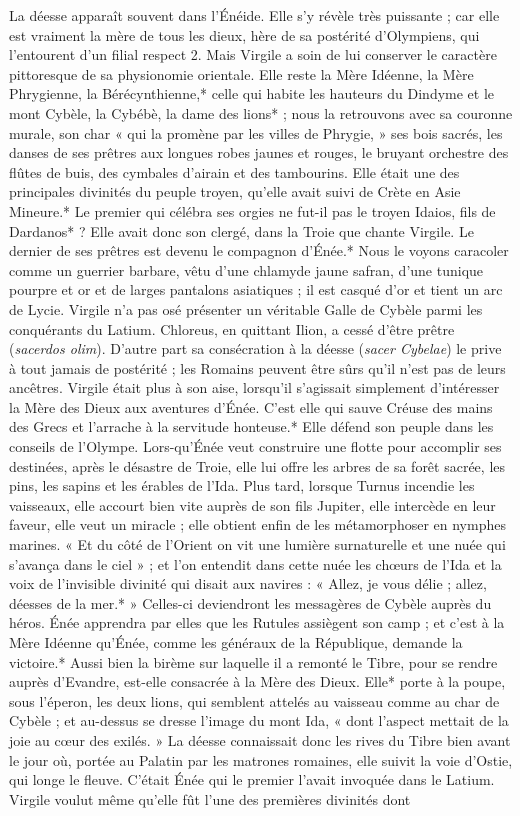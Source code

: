 \documentclass[a4paper, 11pt, oneside, polutonikogreek, french]{article}
\begin{document}
La déesse apparaît souvent dans l'Énéide. Elle s'y révèle très puissante ; car elle est vraiment la mère de tous les dieux, hère de sa postérité d'Olympiens, qui l'entourent d'un filial respect 2. Mais Virgile a soin de lui conserver le caractère pittoresque de sa physionomie orientale. Elle reste la Mère Idéenne, la Mère Phrygienne, la Bérécynthienne,* celle qui habite les hauteurs du Dindyme et le mont Cybèle, la Cybébè, la dame des lions* ; nous la retrouvons avec sa couronne murale, son char « qui la promène par les villes de Phrygie, » ses bois sacrés, les danses de ses prêtres aux longues robes jaunes et rouges, le bruyant orchestre des flûtes de buis, des cymbales d'airain et des tambourins. Elle était une des principales divinités du peuple troyen, qu'elle avait suivi de Crète en Asie Mineure.* Le premier qui célébra ses orgies ne fut-il pas le troyen Idaios, fils de Dardanos* ? Elle avait donc son clergé, dans la Troie que chante Virgile. Le dernier de ses prêtres est devenu le compagnon d'Énée.* Nous le voyons caracoler comme un guerrier barbare, vêtu d'une chlamyde jaune safran, d'une tunique pourpre et or et de larges pantalons asiatiques ; il est casqué d'or et tient un arc de Lycie. Virgile n'a pas osé présenter un véritable Galle de Cybèle parmi les conquérants du Latium. Chloreus, en quittant Ilion, a cessé d'être prêtre (\emph{sacerdos olim}). D'autre part sa consécration à la déesse (\emph{sacer Cybelae}) le prive à tout jamais de postérité ; les Romains peuvent être sûrs qu'il n'est pas de leurs ancêtres. Virgile était plus à son aise, lorsqu'il s'agissait simplement d'intéresser la Mère des Dieux aux aventures d'Énée. C'est elle qui sauve Créuse des mains des Grecs et l'arrache à la servitude honteuse.* Elle défend son peuple dans les conseils de l'Olympe. Lors-qu'Énée veut construire une flotte pour accomplir ses destinées, après le désastre de Troie, elle lui offre les arbres de sa forêt sacrée, les pins, les sapins et les érables de l'Ida. Plus tard, lorsque Turnus incendie les vaisseaux, elle accourt bien vite auprès de son fils Jupiter, elle intercède en leur faveur, elle veut un miracle ; elle obtient enfin de les métamorphoser en nymphes marines. « Et du côté de l'Orient on vit une lumière surnaturelle et une nuée qui s'avança dans le ciel » ; et l'on entendit dans cette nuée les chœurs de l'Ida et la voix de l'invisible divinité qui disait aux navires : « Allez, je vous délie ; allez, déesses de la mer.* » Celles-ci deviendront les messagères de Cybèle auprès du héros. Énée apprendra par elles que les Rutules assiègent son camp ; et c'est à la Mère Idéenne qu'Énée, comme les généraux de la République, demande la victoire.* Aussi bien la birème sur laquelle il a remonté le Tibre, pour se rendre auprès d'Evandre, est-elle consacrée à la Mère des Dieux. Elle* porte à la poupe, sous l'éperon, les deux lions, qui semblent attelés au vaisseau comme au char de Cybèle ; et au-dessus se dresse l'image du mont Ida, « dont l'aspect mettait de la joie au cœur des exilés. » La déesse connaissait donc les rives du Tibre bien avant le jour où, portée au Palatin par les matrones romaines, elle suivit la voie d'Ostie, qui longe le fleuve. C'était Énée qui le premier l'avait invoquée dans le Latium. Virgile voulut même qu'elle fût l'une des premières divinités dont 
\end{document}
